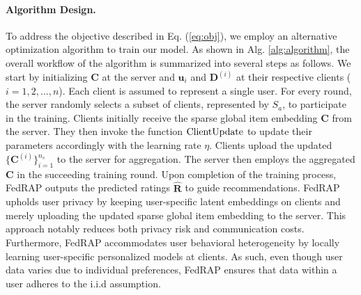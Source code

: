 \documentclass{article} %
\newcommand{\customeqref}[1]{({\ref{#1}})}
\begin{document}
\paragraph{Algorithm Design.}
To address the objective described in Eq. \customeqref{eq:obj}, we employ an alternative optimization algorithm to train our model. 
As shown in Alg. \ref{alg:algorithm}, the overall workflow of the algorithm is summarized into several steps as follows.
We start by initializing $\mathbf{C}$ at the server and $\mathbf{u}_i$ and $\mathbf{D}^{(i)}$ at their respective clients ($i = 1, 2, \dots, n$). Each client is assumed to represent a single user.
For every round, the server randomly selects a subset of clients, represented by $S_a$, to participate in the training.
Clients initially receive the sparse global item embedding $\mathbf{C}$ from the server. They then invoke the function $\rm{ClientUpdate}$ to update their parameters accordingly with the learning rate $\eta$.
Clients upload the updated $\{\mathbf{C}^{(i)}\}^{n_s}_{i=1}$ to the server for aggregation. The server then employs the aggregated $\mathbf{C}$ in the succeeding training round.
Upon completion of the training process, FedRAP outputs the predicted ratings $\hat{\mathbf{R}}$ to guide recommendations.
FedRAP upholds user privacy by keeping user-specific latent embeddings on clients and merely uploading the updated sparse global item embedding to the server.
This approach notably reduces both privacy risk and communication costs. 
Furthermore, FedRAP accommodates user behavioral heterogeneity by locally learning user-specific personalized models at clients. As such, even though user data varies due to individual preferences, FedRAP ensures that data within a user adheres to the i.i.d assumption.
\end{document}
